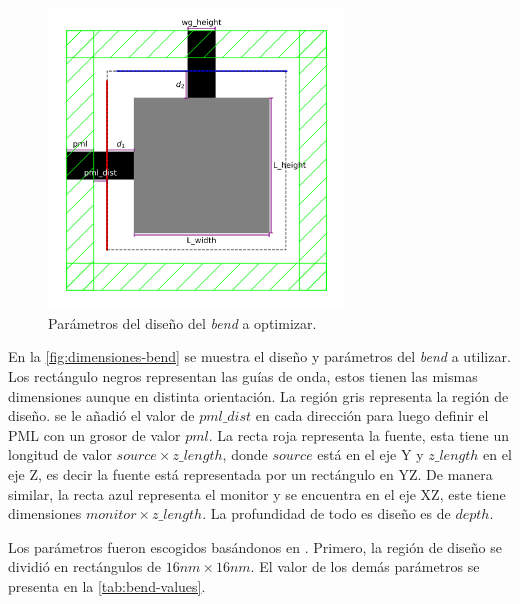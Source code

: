 \begin{figure}[ht]
  \centering
  \includegraphics[width=0.7\textwidth]{image/proposal/bend.png}
  \caption{Parámetros del diseño del \emph{bend} a optimizar.}
  \label{fig:dimensiones-bend}
\end{figure}

En la \autoref{fig:dimensiones-bend} se muestra el diseño y parámetros del \emph{bend} a utilizar.
Los rectángulo negros representan las guías de onda, estos tienen las mismas dimensiones aunque en distinta orientación.
La región gris representa la región de diseño.
 se le añadió el valor de $pml\_dist$ en cada dirección
para luego definir el PML con un grosor de valor $pml$.
La recta roja representa la fuente, esta tiene un longitud de valor
$source \times z\_length$, donde $source$ está en el eje Y y $z\_length$ en el eje Z, es decir la fuente está
representada por un rectángulo en YZ.
De manera similar, la recta azul representa el monitor y se encuentra en el eje XZ, este tiene dimensiones
$monitor \times z\_length$. La profundidad de todo es diseño es de $depth$.

Los parámetros fueron escogidos basándonos en \cite{Su2020}.
Primero, la región de diseño se dividió en rectángulos de $16 nm \times 16 nm$.
El valor de los demás parámetros se presenta en la \autoref{tab:bend-values}.

